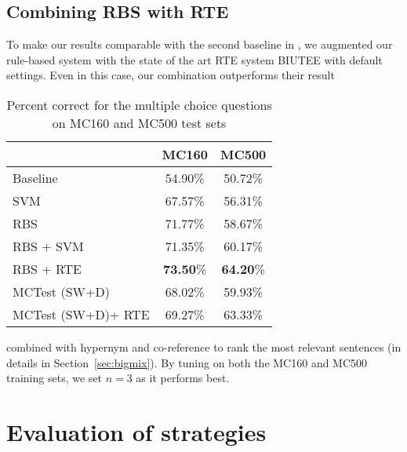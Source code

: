 \documentclass[11pt]{article}
\begin{document}
\subsection{Combining RBS with RTE}
To make our results comparable with the second baseline in , we augmented our rule-based system with the state of the art RTE system BIUTEE \cite{biutee} with default settings. Even in this case, our combination outperforms their result 

\begin{table}[!th]
\begin{tabular}{|l|c|c|}
\hline
 & MC160 & MC500 \\ \hline
Baseline         & 54.90\%  & 50.72\%  \\ \hline
SVM  & 67.57\%  & 56.31\%  \\ \hline
\hline
RBS   & 71.77\%  & 58.67\%  \\ \hline
RBS + SVM   & 71.35\%  & 60.17\%  \\ \hline
RBS + RTE   & \textbf{73.50}\%   & \textbf{64.20}\% \\ \hline
\hline
MCTest (SW+D)   & 68.02\%  & 59.93\%  \\ \hline
MCTest (SW+D)+ RTE   & 69.27\%  & 63.33\%  \\ \hline
\end{tabular}
\caption{Percent correct for the multiple choice questions on MC160 and MC500 test sets}
\label{table:results}
\end{table}


combined with hypernym and co-reference to rank the most relevant sentences (in details in Section~\ref{sec:bigmix}). By tuning on both the MC160 and MC500 training sets, we set $n=3$ as it performs best.

\section{Evaluation of strategies}
\end{document}

